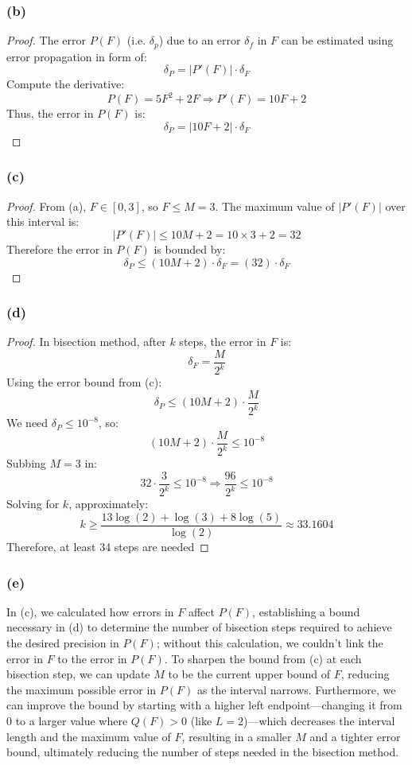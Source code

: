 \documentclass{article}
\begin{document}
\subsubsection*{(b)}
\begin{proof}
    The error $P(F)$ (i.e. $\delta_p$) due to an error $\delta_f$ in $F$ can be estimated using error propagation in form of:
    \[ \delta_P = | P'(F) | \cdot \delta_F \]
    Compute the derivative:
    \[ P(F) = 5F^2 + 2F \Longrightarrow P'(F) = 10F + 2 \]
    Thus, the error in $P(F)$ is:
    \[ \delta_P = | 10F + 2 | \cdot \delta_F \]
\end{proof}

\subsubsection*{(c)}
\begin{proof}
    From (a), $F \in [0,3]$, so $F \leq M = 3$. The maximum value of $| P'(F) |$ over this interval is:
    \[ | P'(F) | \leq 10M + 2 = 10 \times 3 + 2 = 32 \]
    Therefore the error in $P(F)$ is bounded by:
    \[ \delta_P \leq (10M + 2) \cdot \delta_F = (32) \cdot \delta_{F} \]
\end{proof} 

\subsubsection*{(d)}
\begin{proof}
    In bisection method, after $k$ steps, the error in $F$ is:
    \[ \delta_F = \frac{M}{2^k} \]
    Using the error bound from (c):
    \[ \delta_P \leq (10M + 2) \cdot \frac{M}{2^k} \]
    We need $\delta_P \leq 10^{-8}$, so:
    \[ (10M + 2) \cdot \frac{M}{2^k} \leq 10^{-8} \]
    Subbing $M = 3$ in:
    \[ 32 \cdot \frac{3}{2^k} \leq 10^{-8} \Longrightarrow \frac{96}{2^k} \leq 10^{-8} \]
    Solving for $k$, approximately:
    \[ k \geq \frac{13 \log(2) + \log(3) + 8\log(5)}{\log(2)} \approx 33.1604 \]
    Therefore, at least 34 steps are needed
\end{proof} 

\subsubsection*{(e)}
In (c), we calculated how errors in \( F \) affect \( P(F) \), establishing a bound necessary in (d) to determine the number of bisection steps required to achieve the desired precision in \( P(F) \); without this calculation, we couldn't link the error in \( F \) to the error in \( P(F) \). To sharpen the bound from (c) at each bisection step, we can update \( M \) to be the current upper bound of \( F \), reducing the maximum possible error in \( P(F) \) as the interval narrows. Furthermore, we can improve the bound by starting with a higher left endpoint—changing it from \( 0 \) to a larger value where \( Q(F) > 0 \) (like \( L = 2 \))—which decreases the interval length and the maximum value of \( F \), resulting in a smaller \( M \) and a tighter error bound, ultimately reducing the number of steps needed in the bisection method.
\end{document}
